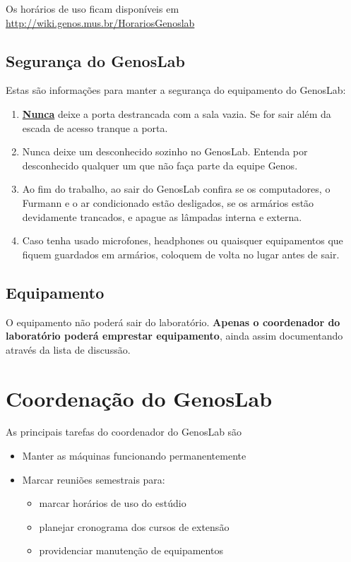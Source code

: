 \documentclass[12pt,brazil]{book}
\begin{document}
Os horários de uso ficam disponíveis em
\url{http://wiki.genos.mus.br/HorariosGenoslab}

\section{Segurança do GenosLab}
\label{sec:segur-do-genosl}

Estas são informações para manter a segurança do equipamento do
GenosLab:

\begin{enumerate}
\item \underline{\textbf{Nunca}} deixe a porta destrancada com a sala
  vazia. Se for sair além da escada de acesso tranque a porta.
\item Nunca deixe um desconhecido sozinho no GenosLab. Entenda por
  desconhecido qualquer um que não faça parte da equipe Genos.
\item Ao fim do trabalho, ao sair do GenosLab confira se os
  computadores, o Furmann e o ar condicionado estão desligados, se os
  armários estão devidamente trancados, e apague as lâmpadas interna e
  externa.
\item Caso tenha usado microfones, headphones ou quaisquer
  equipamentos que fiquem guardados em armários, coloquem de volta no
  lugar antes de sair.
\end{enumerate}

\section{Equipamento}
\label{sec:equipamento}

O equipamento não poderá sair do laboratório. \textbf{Apenas o
  coordenador do laboratório poderá emprestar equipamento}, ainda
assim documentando através da lista de discussão.

\chapter{Coordenação do GenosLab}
\label{cha:coordenacao-do-genos}

As principais tarefas do coordenador do GenosLab são

\begin{itemize}
\item Manter as máquinas funcionando permanentemente
\item Marcar reuniões semestrais para:
  \begin{itemize}
  \item marcar horários de uso do estúdio
  \item planejar cronograma dos cursos de extensão
  \item providenciar manutenção de equipamentos
  \end{itemize}
\end{itemize}
\end{document}
